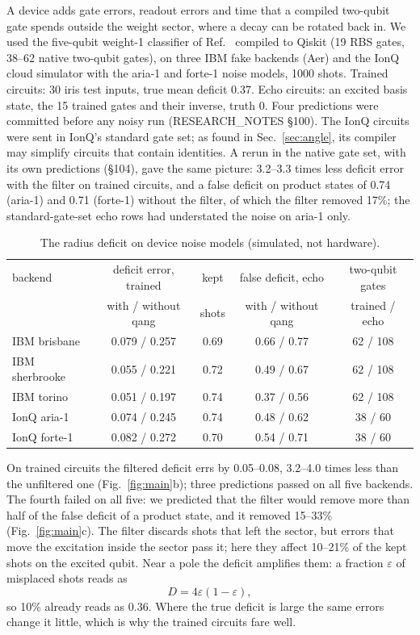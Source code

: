 \documentclass[11pt]{article}
\begin{document}
A device adds gate errors, readout errors and time that a compiled two-qubit gate spends outside the weight sector,
where a decay can be rotated back in. We used the five-qubit weight-1 classifier of Ref.~\cite{monteverde2026qml}
compiled to Qiskit (19 RBS gates, 38--62 native two-qubit gates), on three IBM fake backends (Aer) and the IonQ cloud
simulator with the aria-1 and forte-1 noise models, 1000 shots. Trained circuits: 30 iris test inputs, true mean
deficit 0.37. Echo circuits: an excited basis state, the 15 trained gates and their inverse, truth 0. Four predictions
were committed before any noisy run (RESEARCH\_NOTES \S100). The IonQ circuits were sent in IonQ's standard gate set;
as found in Sec.~\ref{sec:angle}, its compiler may simplify circuits that contain identities. A rerun in the native gate
set, with its own predictions (\S104), gave the same picture: 3.2--3.3 times less deficit error with the filter on
trained circuits, and a false deficit on product states of 0.74 (aria-1) and 0.71 (forte-1) without the filter, of
which the filter removed 17\%; the standard-gate-set echo rows had understated the noise on aria-1 only.

\begin{table}[h]
\centering\small
\begin{tabular}{lcccc}
\toprule
backend & deficit error, trained & kept & false deficit, echo & two-qubit gates \\
 & with / without qang & shots & with / without qang & trained / echo \\
\midrule
IBM brisbane & 0.079 / 0.257 & 0.69 & 0.66 / 0.77 & 62 / 108 \\
IBM sherbrooke & 0.055 / 0.221 & 0.72 & 0.49 / 0.67 & 62 / 108 \\
IBM torino & 0.051 / 0.197 & 0.74 & 0.37 / 0.56 & 62 / 108 \\
IonQ aria-1 & 0.074 / 0.245 & 0.74 & 0.48 / 0.62 & 38 / 60 \\
IonQ forte-1 & 0.082 / 0.272 & 0.70 & 0.54 / 0.71 & 38 / 60 \\
\bottomrule
\end{tabular}
\caption{The radius deficit on device noise models (simulated, not hardware).}
\label{tab:dev}
\end{table}

On trained circuits the filtered deficit errs by 0.05--0.08, 3.2--4.0 times less than the unfiltered one
(Fig.~\ref{fig:main}b); three predictions passed on all five backends. The fourth failed on all five: we predicted
that the filter would remove more than half of the false deficit of a product state, and it removed 15--33\%
(Fig.~\ref{fig:main}c). The filter discards shots that left the sector, but errors that move the excitation inside
the sector pass it; here they affect 10--21\% of the kept shots on the excited qubit. Near a pole the deficit amplifies
them: a fraction $\varepsilon$ of misplaced shots reads as
\begin{equation}
D=4\varepsilon(1-\varepsilon),
\end{equation}
so 10\% already reads as 0.36. Where the true deficit is large the same errors change it little, which is why the
trained circuits fare well.
\end{document}
